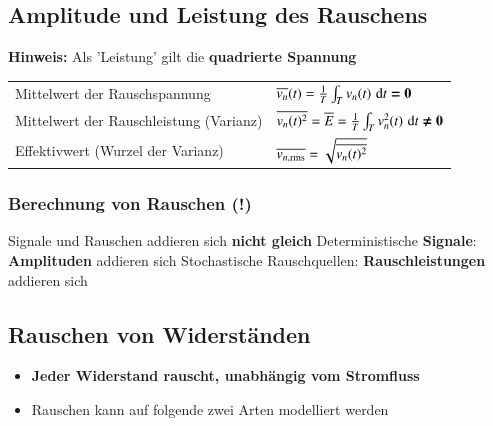 \subsection{Amplitude und Leistung des Rauschens}

\textbf{Hinweis:} Als 'Leistung' gilt die \textbf{quadrierte Spannung}

\renewcommand{\arraystretch}{2}
\begin{tabular}{ll}
    Mittelwert der Rauschspannung               & $\overline{v_n}(t) = \frac{1}{T} \int_T v_n(t) \, \mathop{} \! \mathrm{d} t \bm{= 0}$ \\
    Mittelwert der Rauschleistung (Varianz)     & $\overline{v_n(t)^2} = \overline{E} = \frac{1}{T} \int_T v_n^2(t) \, \mathop{} \! \mathrm{d} t \bm{\neq 0}$ \\
    Effektivwert (Wurzel der Varianz)           & $\overline{v_{n, \rm rms}} = \sqrt{\overline{v_n(t)^2}} $\\
\end{tabular}
\renewcommand{\arraystretch}{1}


\subsubsection{Berechnung von Rauschen (!)}

\begin{outline}
    \1 Signale und Rauschen addieren sich \textbf{nicht gleich}
        \2 Deterministische \textbf{Signale}: \textbf{Amplituden} addieren sich
        \2 Stochastische Rauschquellen: \textbf{Rauschleistungen} addieren sich
\end{outline}


\subsection{Rauschen von Widerständen}

\begin{itemize}
    \item \textbf{Jeder Widerstand rauscht, unabhängig vom Stromfluss}
    \item Rauschen kann auf folgende zwei Arten modelliert werden
\end{itemize}


